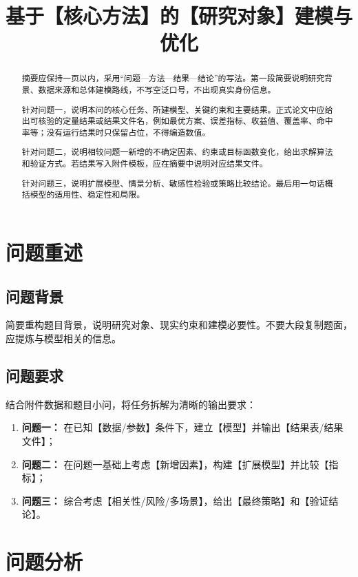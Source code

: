 \documentclass[withoutpreface,bwprint]{cumcmthesis}
\title{基于【核心方法】的【研究对象】建模与优化}
\begin{document}
\maketitle

\begin{abstract}
摘要应保持一页以内，采用“问题—方法—结果—结论”的写法。第一段简要说明研究背景、数据来源和总体建模路线，不写空泛口号，不出现真实身份信息。

针对问题一，说明本问的核心任务、所建模型、关键约束和主要结果。正式论文中应给出可核验的定量结果或结果文件名，例如最优方案、误差指标、收益值、覆盖率、命中率等；没有运行结果时只保留占位，不得编造数值。

针对问题二，说明相较问题一新增的不确定因素、约束或目标函数变化，给出求解算法和验证方式。若结果写入附件模板，应在摘要中说明对应结果文件。

针对问题三，说明扩展模型、情景分析、敏感性检验或策略比较结论。最后用一句话概括模型的适用性、稳定性和局限。

\end{abstract}


\section{问题重述}
\subsection{问题背景}
简要重构题目背景，说明研究对象、现实约束和建模必要性。不要大段复制题面，应提炼与模型相关的信息。

\subsection{问题要求}
结合附件数据和题目小问，将任务拆解为清晰的输出要求：
\begin{enumerate}
  \item \textbf{问题一：} 在已知【数据/参数】条件下，建立【模型】并输出【结果表/结果文件】；
  \item \textbf{问题二：} 在问题一基础上考虑【新增因素】，构建【扩展模型】并比较【指标】；
  \item \textbf{问题三：} 综合考虑【相关性/风险/多场景】，给出【最终策略】和【验证结论】。
\end{enumerate}

\section{问题分析}
\end{document}
